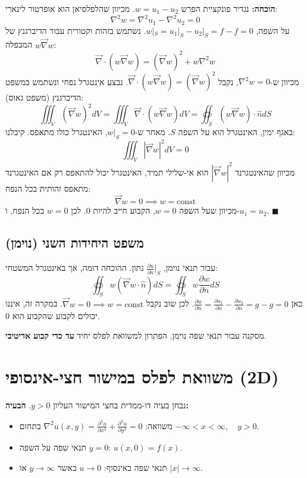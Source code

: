\textbf{הוכחה:}
נגדיר פונקציית הפרש $w = u_1 - u_2$. מכיוון שהלפלסיאן הוא אופרטור לינארי:
\[ \nabla^2 w = \nabla^2 u_1 - \nabla^2 u_2 = 0 \]
על השפה, $w|_S = u_1|_S - u_2|_S = f - f = 0$.
נשתמש בזהות וקטורית עבור הדיברגנץ של המכפלה $w \vec{\nabla} w$:
\[ \vec{\nabla} \cdot (w \vec{\nabla} w) = (\vec{\nabla} w)^2 + w \nabla^2 w \]
מכיוון ש-$\nabla^2 w = 0$, נקבל $\vec{\nabla} \cdot (w \vec{\nabla} w) = (\vec{\nabla} w)^2$.
נבצע אינטגרל נפחי ונשתמש במשפט הדיברגנץ (משפט גאוס):
\[ \iiint_V (\vec{\nabla} w)^2 dV = \iiint_V \vec{\nabla} \cdot (w \vec{\nabla} w) dV = \oiint_S (w \vec{\nabla} w) \cdot \hat{n} dS \]
באגף ימין, האינטגרל הוא על השפה $S$. מאחר ש-$w|_S = 0$, האינטגרל כולו מתאפס.
קיבלנו:
\[ \iiint_V |\vec{\nabla} w|^2 dV = 0 \]
מכיוון שהאינטגרנד $|\vec{\nabla} w|^2$ הוא אי-שלילי תמיד, האינטגרל יכול להתאפס רק אם האינטגרנד מתאפס זהותית בכל הנפח:
\[ \vec{\nabla} w = 0 \implies w = \text{const} \]
מכיוון שעל השפה $w=0$, הקבוע חייב להיות 0. לכן $w=0$ בכל הנפח, ו-$u_1 = u_2$. $\blacksquare$

\subsection{משפט היחידות השני (נוימן)}
עבור תנאי נוימן, $\frac{\partial u}{\partial n}|_S$ נתון. ההוכחה דומה, אך באינטגרל המשטחי:
\[ \oiint_S w (\vec{\nabla} w \cdot \hat{n}) dS = \oiint_S w \frac{\partial w}{\partial n} dS \]
כאן $\frac{\partial w}{\partial n} = \frac{\partial u_1}{\partial n} - \frac{\partial u_2}{\partial n} = g - g = 0$.
לכן שוב נקבל $\vec{\nabla} w = 0 \implies w = \text{const}$.
במקרה זה, איננו יכולים לקבוע שהקבוע הוא 0.
\begin{resultbox}{מסקנה}
עבור תנאי שפה נוימן, הפתרון למשוואת לפלס יחיד \textbf{עד כדי קבוע אדיטיבי}.
\end{resultbox}

\section{משוואת לפלס במישור חצי-אינסופי (2D)}

נבחן בעיה דו-ממדית בחצי המישור העליון $y > 0$.
\textbf{הבעיה:}
\begin{itemize}
    \item משוואה: $\nabla^2 u(x,y) = \frac{\partial^2 u}{\partial x^2} + \frac{\partial^2 u}{\partial y^2} = 0$ בתחום $-\infty < x < \infty, \quad y > 0$.
    \item תנאי שפה על השפה $y=0$: $u(x,0) = f(x)$.
    \item תנאי שפה באינסוף: $u \to 0$ כאשר $y \to \infty$ או $|x| \to \infty$.
\end{itemize}
\begin{center}
    
\end{center}


